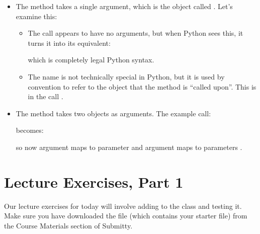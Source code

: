 \documentclass[letterpaper,10pt,english]{sphinxmanual}
\begin{document}
\begin{itemize}
\item {} 
The method  takes a single argument, which is the
 object called .  Let’s examine this:
\begin{itemize}
\item {} 
The call  appears to have no arguments, but
when Python sees this, it turns it into its equivalent:

\begin{sphinxVerbatim}[commandchars=\\\{\}]
\end{sphinxVerbatim}

which is completely legal Python syntax.

\item {} 
The name  is not technically special in Python, but it
is used by convention to refer to the object that the method is
“called upon”.  This is  in the call .

\end{itemize}

\item {} 
The method  takes two  objects as
arguments. The example call:

\begin{sphinxVerbatim}[commandchars=\\\{\}]
\end{sphinxVerbatim}

becomes:

\begin{sphinxVerbatim}[commandchars=\\\{\}]
 
\end{sphinxVerbatim}

so now argument  maps to parameter  and argument 
maps to parameters .

\end{itemize}


\section{Lecture Exercises, Part 1}
\label{\detokenize{lecture_notes/lec18_classes1:lecture-exercises-part-1}}
Our lecture exercises for today will involve adding to the 
class and testing it.  Make sure you have downloaded the
 file (which contains your starter  file)
from the Course Materials section of Submitty.
\end{document}

